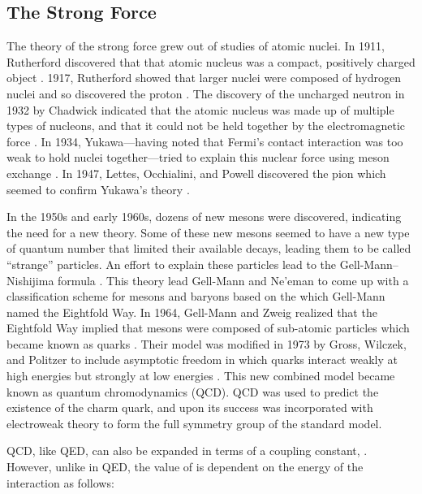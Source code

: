 \subsection{The Strong Force}
\label{subsection:Strong_force}

The theory of the strong force grew out of studies of atomic nuclei. In 1911,
Rutherford discovered that that atomic nucleus was a compact, positively
charged object \cite{rutherford1911}. 1917, Rutherford showed that larger
nuclei were composed of hydrogen nuclei and so discovered the proton
\cite{rutherford1919}. The discovery of the uncharged neutron in 1932 by
Chadwick indicated that the atomic nucleus was made up of multiple types of
nucleons, and that it could not be held together by the electromagnetic force
\cite{chadwick1932}. In 1934, Yukawa---having noted that Fermi's contact
interaction was too weak to hold nuclei together---tried to explain this
nuclear force using meson exchange \cite{yukawa1935}. In 1947, Lettes,
Occhialini, and Powell discovered the pion which seemed to confirm Yukawa's
theory \cite{lattes1947}.

In the 1950s and early 1960s, dozens of new mesons were discovered, indicating
the need for a new theory. Some of these new mesons seemed to have a new type
of quantum number that limited their available decays, leading them to be
called ``strange'' particles. An effort to explain these particles lead to the
Gell-Mann--Nishijima formula
\cite{nakano1953}\cite{nishijima1955}\cite{gellmann1956}. This theory lead
Gell-Mann and Ne'eman to come up with a classification scheme for mesons and
baryons based on the \SUthree which Gell-Mann named the Eightfold Way. In 1964,
Gell-Mann and Zweig realized that the Eightfold Way implied that mesons were
composed of sub-atomic particles which became known as quarks
\cite{gellmann1964}\cite{zweig1964}. Their model was modified in 1973 by Gross,
Wilczek, and Politzer to include asymptotic freedom in which quarks interact
weakly at high energies but strongly at low energies
\cite{gross_1973}\cite{politzer_1973}. This new combined model became known as
quantum chromodynamics (QCD). QCD was used to predict the existence of the
charm quark, and upon its success was incorporated with electroweak theory to
form the full \SUthreeSUtwoUone symmetry group of the standard model.

QCD, like QED, can also be expanded in terms of a coupling constant,
\alphastrong. However, unlike \fsc in QED, the value of \alphastrong is
dependent on the energy of the interaction as follows:

